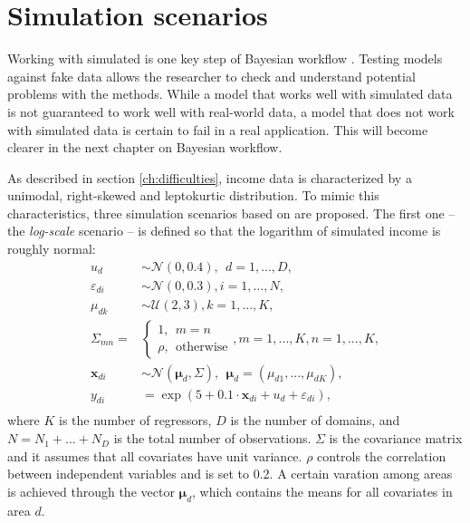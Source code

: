 \section{Simulation scenarios}
\label{ch:simulations}
Working with simulated is one key step of Bayesian workflow \citep{gelman_bayesian_2020}.
Testing models against fake data allows the researcher to check and understand potential problems with the methods.
While a model that works well with simulated data is not guaranteed to work well with real-world data,
a model that does not work with simulated data is certain to fail in a real application.
This will become clearer in the next chapter on Bayesian workflow.

As described in section \ref{ch:difficulties}, income data is characterized by a unimodal, right-skewed and leptokurtic distribution.
To mimic this characteristics, three simulation scenarios based on \cite{rojas_perilla_data_2020} are proposed.
The first one – the \textit{log-scale} scenario – is defined so that the logarithm of simulated income is roughly normal:
\begin{equation}
    \begin{split}
        u_d & \sim \mathcal N(0, 0.4), ~~ d = 1,...,D,\\
        \varepsilon_{di} & \sim \mathcal{N}(0, 0.3), i = 1,...,N,\\
        \mu_{dk} & \sim \mathcal{U}(2, 3), k = 1,...,K,\\
        \Sigma_{mn} = &\begin{cases} 1, ~~ m = n \\ \rho,  ~~ \text{otherwise}  \end{cases},
            m = 1,...,K, n = 1,...,K,\\
        \boldsymbol x_{di}  &\sim \mathcal N (\boldsymbol \mu_{d}, \Sigma) ,
            ~~ \boldsymbol \mu_{d} = (\mu_{d1}, ..., \mu_{dK}),\\
        y_{di} & = \exp(5 + 0.1 \cdot \boldsymbol x_{di}  + u_d + \varepsilon_{di}),\\
    \end{split}
    \label{eq:log_scenario}
\end{equation}
where $K$ is the number of regressors, $D$ is the number of domains, and $N = N_1 + ... + N_D$ is the total number of observations.
$\Sigma$ is the covariance matrix and it assumes that all covariates have unit variance. $\rho$ controls the correlation between independent variables and is set to 0.2.
A certain varation among areas is achieved through the vector $\boldsymbol \mu_d$, which contains the means for all covariates in area $d$.
